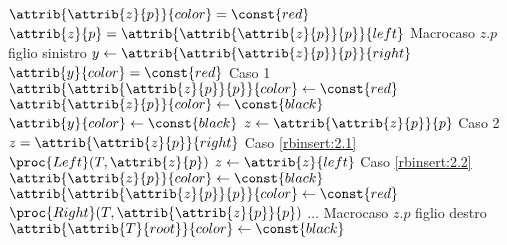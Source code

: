\begin{codebox}
\li \While $\attrib{\attrib{z}{p}}{color} = \const{red}$
\li \Do
        \If $\attrib{z}{p} = \attrib{\attrib{\attrib{z}{p}}{p}}{left}$
        	\Comment Macrocaso $z.p$ figlio sinistro
\li     \Then
            $y \gets \attrib{\attrib{\attrib{z}{p}}{p}}{right}$
\li         \If $\attrib{y}{color} = \const{red}$
				\Comment Caso 1
\li         \Then
                $\attrib{\attrib{\attrib{z}{p}}{p}}{color} \gets \const{red}$
\li             $\attrib{\attrib{z}{p}}{color} \gets \const{black}$
\li             $\attrib{y}{color} \gets \const{black}$
\li             $z \gets \attrib{\attrib{z}{p}}{p}$
\li         \Else
				\Comment Caso 2
\li	          	\If $z = \attrib{\attrib{z}{p}}{right}$
	          		\Comment Caso \ref{rbinsert:2.1}
\li             \Then
                    $\proc{Left}(T,\attrib{z}{p})$
\li                 $z \gets \attrib{z}{left}$
                \End
\zi             \Comment Caso \ref{rbinsert:2.2}
\li             $\attrib{\attrib{z}{p}}{color} \gets \const{black}$
\li             $\attrib{\attrib{\attrib{z}{p}}{p}}{color} \gets \const{red}$
\li             $\proc{Right}(T,\attrib{\attrib{z}{p}}{p})$
            \End
\li     \Else
\li			$\dots$ \Comment Macrocaso $z.p$ figlio destro
        \End
    \End
\li $\attrib{\attrib{T}{root}}{color} \gets \const{black}$
\end{codebox}